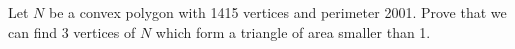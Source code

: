Let $N$ be a convex polygon with 1415 vertices and perimeter 2001. Prove that we can find 3 vertices of $N$ which form a triangle of area smaller than 1.